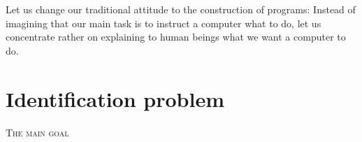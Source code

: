 
\begin{savequote}[99mm]
Let us change our traditional attitude to the construction of programs: Instead of imagining that our main task is to instruct a computer what to do, let us concentrate rather on explaining to human beings what we want a computer to do.
\end{savequote}

\chapter{Identification problem}\label{chap:id-problem}

\lettrine[lines=5, loversize=-0.1, lraise=0.1]{T}{he main goal} 
